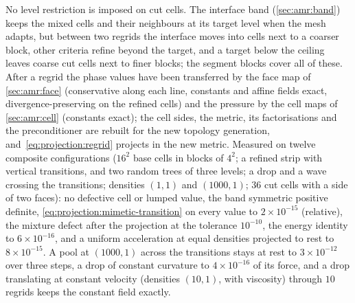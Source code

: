 No level restriction is imposed on cut cells. The interface band
(\cref{sec:amr:band}) keeps the mixed cells and their neighbours at its
target level when the mesh adapts, but between two regrids the interface
moves into cells next to a coarser block, other criteria refine beyond the
target, and a target below the ceiling leaves coarse cut cells next to finer
blocks; the segment blocks cover all of these. After a regrid the phase
values have been transferred by the face map of \cref{sec:amr:face}
(conservative along each line, constants and affine fields exact,
divergence-preserving on the refined cells) and the pressure by the cell
maps of \cref{sec:amr:cell} (constants exact); the cell sides, the metric,
its factorisations and the preconditioner are rebuilt for the new topology
generation, and~\cref{eq:projection:regrid} projects in the new metric.
Measured on twelve composite configurations ($16^2$ base cells in blocks of
$4^2$; a refined strip with vertical transitions, and two random trees of
three levels; a drop and a wave crossing the transitions; densities $(1,1)$
and $(1000,1)$; $36$ cut cells with a side of two faces):
no defective cell or lumped value, the band symmetric positive definite,
\cref{eq:projection:mimetic-transition} on every value to
$2\times10^{-15}$ (relative), the mixture defect after the projection at the
tolerance $10^{-10}$, the energy identity to $6\times10^{-16}$, and a uniform
acceleration at equal densities projected to rest to $8\times10^{-15}$. A
pool at $(1000,1)$ across the transitions stays at rest to $3\times10^{-12}$
over three steps, a drop of constant curvature to $4\times10^{-16}$ of its
force, and a drop translating at constant velocity (densities $(10,1)$, with
viscosity) through $10$ regrids keeps the constant field exactly.

